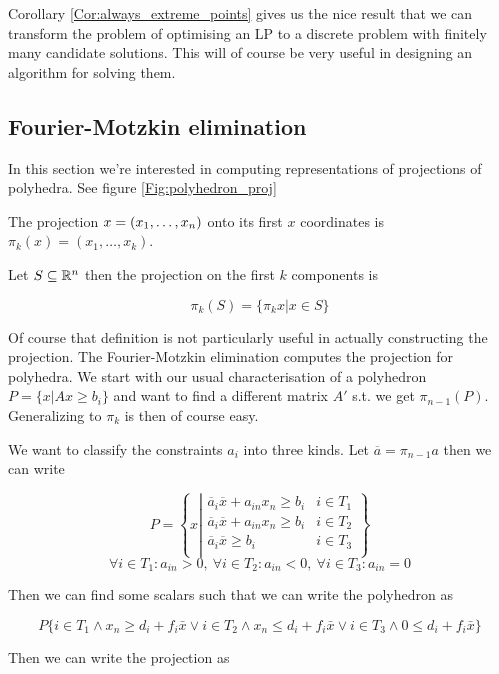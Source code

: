 Corollary \ref{Cor:always_extreme_points} gives us the nice result that we can transform the problem of optimising an LP to a discrete problem with finitely many candidate solutions. This will of course be very useful in designing an algorithm for solving them.

\subsection*{Fourier-Motzkin elimination}

In this section we're interested in computing representations of projections of polyhedra. See figure \ref{Fig:polyhedron_proj}

\begin{Def} The projection $x=({x}_1,\ldots,{x}_n)$ onto its first $x$ coordinates is $\pi_k(x) = (x_1,\ldots, x_k)$. 

Let $S\subseteq \mathbb{R}^n$ then the projection on the first $k$ components is

\[\pi_k(S)=\{\pi_k{x}|x\in S\}\]
\end{Def}

Of course that definition is not particularly useful in actually constructing the projection. The Fourier-Motzkin elimination computes the projection for polyhedra. We start with our usual characterisation of a polyhedron $P=\{x|Ax\geq b_i\}$ and want to find a different matrix $A'$ s.t. we get $\pi_{n-1}(P)$. Generalizing to $\pi_k$ is then of course easy.

We want to classify the constraints $a_i$ into three kinds. Let $\overline a = \pi_{n-1}a$ then we can write  

\[P=\left\{x\left| \begin{array}{cr}
\overline a_i\overline x +a_{in}x_n \geq b_i & i\in T_1\\
\overline a_i\overline x +a_{in}x_n \geq b_i & i\in T_2\\
\overline a_i\overline x \geq b_i & i\in T_3\\
\end{array}\right.\right\}\]
\[\forall i\in T_1: a_{in}>0,\ \forall i\in T_2: a_{in}<0,\ \forall i\in T_3: a_{in}=0 \]

Then we can find some scalars such that we can write the polyhedron as

\[P \{i\in T_1 \wedge x_n \geq d_i + f_i \bar x \vee i\in T_2 \wedge x_n \leq d_i + f_i \bar x \vee i\in T_3 \wedge 0 \leq d_i + f_i \bar x\}\]

Then we can write the projection as 

